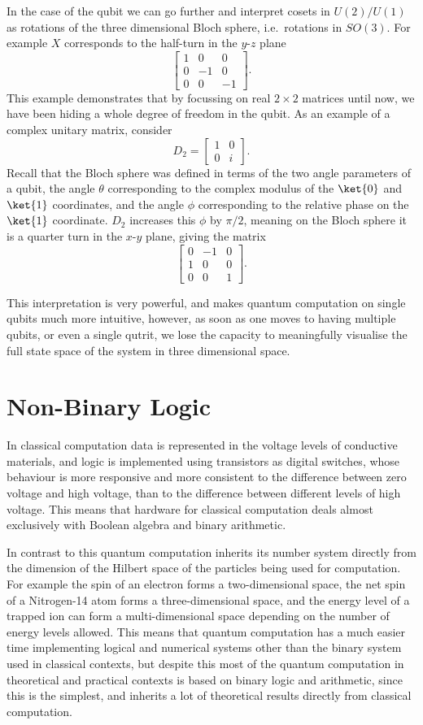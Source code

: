 In the case of the qubit we can go further and interpret cosets in $U(2)/U(1)$ as rotations of the three dimensional Bloch sphere, i.e.\ rotations in $SO(3)$. For example $X$ corresponds to the half-turn in the $y$-$z$ plane
\[\begin{bmatrix}
1 & 0 & 0 \\
0 & -1 & 0 \\
0 & 0 & -1
\end{bmatrix}.\]
This example demonstrates that by focussing on real $2 \times 2$ matrices until now, we have been hiding a whole degree of freedom in the qubit. As an example of a complex unitary matrix, consider
\[D_2 = \begin{bmatrix}
1 & 0 \\
0 & i
\end{bmatrix}.\]
Recall that the Bloch sphere was defined in terms of the two angle parameters of a qubit, the angle $\theta$ corresponding to the complex modulus of the $\ket{0}$ and $\ket{1}$ coordinates, and the angle $\phi$ corresponding to the relative phase on the $\ket{1}$ coordinate. $D_2$ increases this $\phi$ by $\pi/2$, meaning on the Bloch sphere it is a quarter turn in the $x$-$y$ plane, giving the matrix
\[\begin{bmatrix}
	0 & -1 & 0 \\
	1 & 0 & 0 \\
	0 & 0 & 1
\end{bmatrix}.\]

This interpretation is very powerful, and makes quantum computation on single qubits much more intuitive, however, as soon as one moves to having multiple qubits, or even a single qutrit, we lose the capacity to meaningfully visualise the full state space of the system in three dimensional space.

\section{Non-Binary Logic}
In classical computation data is represented in the voltage levels of conductive materials, and logic is implemented using transistors as digital switches, whose behaviour is more responsive and more consistent to the difference between zero voltage and high voltage, than to the difference between different levels of high voltage. This means that hardware for classical computation deals almost exclusively with Boolean algebra and binary arithmetic.

In contrast to this quantum computation inherits its number system directly from the dimension of the Hilbert space of the particles being used for computation. For example the spin of an electron forms a two-dimensional space, the net spin of a Nitrogen-14 atom forms a three-dimensional space, and the energy level of a trapped ion can form a multi-dimensional space depending on the number of energy levels allowed. This means that quantum computation has a much easier time implementing logical and numerical systems other than the binary system used in classical contexts, but despite this most of the quantum computation in theoretical and practical contexts is based on binary logic and arithmetic, since this is the simplest, and inherits a lot of theoretical results directly from classical computation.

